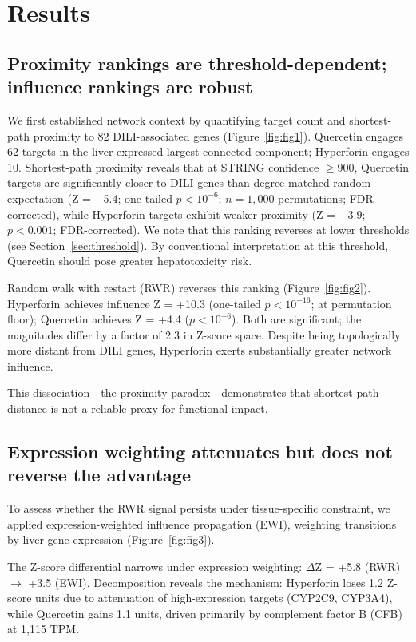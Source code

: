 \section{Results}

\subsection{Proximity rankings are threshold-dependent; influence rankings are robust}

We first established network context by quantifying target count and shortest-path proximity to 82 DILI-associated genes (Figure~\ref{fig:fig1}).
Quercetin engages 62 targets in the liver-expressed largest connected component; Hyperforin engages 10.
Shortest-path proximity reveals that at STRING confidence $\geq$900, Quercetin targets are significantly closer to DILI genes than degree-matched random expectation (Z = $-$5.4; one-tailed $p < 10^{-6}$; $n = 1{,}000$ permutations; FDR-corrected), while Hyperforin targets exhibit weaker proximity (Z = $-$3.9; $p < 0.001$; FDR-corrected).
We note that this ranking reverses at lower thresholds (see Section~\ref{sec:threshold}).
By conventional interpretation at this threshold, Quercetin should pose greater hepatotoxicity risk.

Random walk with restart (RWR) reverses this ranking (Figure~\ref{fig:fig2}).
Hyperforin achieves influence Z = +10.3 (one-tailed $p < 10^{-16}$; at permutation floor); Quercetin achieves Z = +4.4 ($p < 10^{-6}$).
Both are significant; the magnitudes differ by a factor of 2.3 in Z-score space.
Despite being topologically more distant from DILI genes, Hyperforin exerts substantially greater network influence.

This dissociation---the proximity paradox---demonstrates that shortest-path distance is not a reliable proxy for functional impact.

\subsection{Expression weighting attenuates but does not reverse the advantage}

To assess whether the RWR signal persists under tissue-specific constraint, we applied expression-weighted influence propagation (EWI), weighting transitions by liver gene expression (Figure~\ref{fig:fig3}).

The Z-score differential narrows under expression weighting: $\Delta$Z = +5.8 (RWR) $\rightarrow$ +3.5 (EWI).
Decomposition reveals the mechanism: Hyperforin loses 1.2 Z-score units due to attenuation of high-expression targets (CYP2C9, CYP3A4), while Quercetin gains 1.1 units, driven primarily by complement factor B (CFB) at 1{,}115 TPM.

